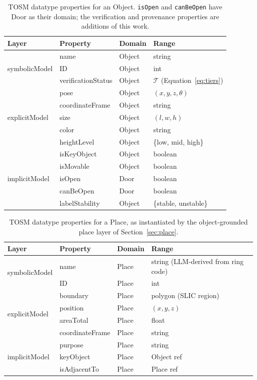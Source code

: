 \begin{table}[htbp]
  \centering
  \caption{TOSM datatype properties for an Object. \texttt{isOpen} and
  \texttt{canBeOpen} have Door as their domain; the verification and provenance
  properties are additions of this work.}
  \label{tab:tosm-object}
  \begin{tabular}{l l l l}
    \toprule
    \textbf{Layer} & \textbf{Property} & \textbf{Domain} & \textbf{Range} \\
    \midrule
    \multirow{3}{*}{symbolicModel}
      & name & Object & string \\
      & ID   & Object & int \\
      & verificationStatus & Object & $\mathcal{T}$ (Equation~\ref{eq:tiers}) \\
    \midrule
    \multirow{5}{*}{explicitModel}
      & pose & Object & $(x, y, z, \theta)$ \\
      & coordinateFrame & Object & string \\
      & size & Object & $(l, w, h)$ \\
      & color & Object & string \\
      & heightLevel & Object & \{low, mid, high\} \\
    \midrule
    \multirow{5}{*}{implicitModel}
      & isKeyObject & Object & boolean \\
      & isMovable & Object & boolean \\
      & isOpen & Door & boolean \\
      & canBeOpen & Door & boolean \\
      & labelStability & Object & \{stable, unstable\} \\
    \bottomrule
  \end{tabular}
\end{table}

\begin{table}[htbp]
  \centering
  \caption{TOSM datatype properties for a Place, as instantiated by the
  object-grounded place layer of Section~\ref{sec:place}.}
  \label{tab:tosm-place}
  \begin{tabular}{l l l l}
    \toprule
    \textbf{Layer} & \textbf{Property} & \textbf{Domain} & \textbf{Range} \\
    \midrule
    \multirow{2}{*}{symbolicModel}
      & name & Place & string (LLM-derived from ring code) \\
      & ID   & Place & int \\
    \midrule
    \multirow{4}{*}{explicitModel}
      & boundary & Place & polygon (SLIC region) \\
      & position & Place & $(x, y, z)$ \\
      & areaTotal & Place & float \\
      & coordinateFrame & Place & string \\
    \midrule
    \multirow{3}{*}{implicitModel}
      & purpose & Place & string \\
      & keyObject & Place & Object ref \\
      & isAdjacentTo & Place & Place ref \\
    \bottomrule
  \end{tabular}
\end{table}

